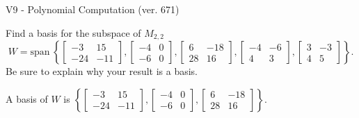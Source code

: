 \begin{exercise}
  \begin{exerciseTitle}V9 - Polynomial Computation (ver. 671)\end{exerciseTitle}
  \begin{exerciseStatement}
    Find a basis for the subspace of \(M_{2,2}\) 
\[W=\mathrm{span}\ \left\{\left[\begin{array}{cc}
-3 & 15 \\
-24 & -11
\end{array}\right] , \left[\begin{array}{cc}
-4 & 0 \\
-6 & 0
\end{array}\right] , \left[\begin{array}{cc}
6 & -18 \\
28 & 16
\end{array}\right] , \left[\begin{array}{cc}
-4 & -6 \\
4 & 3
\end{array}\right] , \left[\begin{array}{cc}
3 & -3 \\
4 & 5
\end{array}\right]\right\}.\]
 Be sure to explain why your result is a basis.


  \end{exerciseStatement}
  \begin{exerciseAnswer}
   A basis of \(W\) is  \(\left\{\left[\begin{array}{cc}
-3 & 15 \\
-24 & -11
\end{array}\right] , \left[\begin{array}{cc}
-4 & 0 \\
-6 & 0
\end{array}\right] , \left[\begin{array}{cc}
6 & -18 \\
28 & 16
\end{array}\right]\right\}\).
  


  \end{exerciseAnswer}
\end{exercise}
